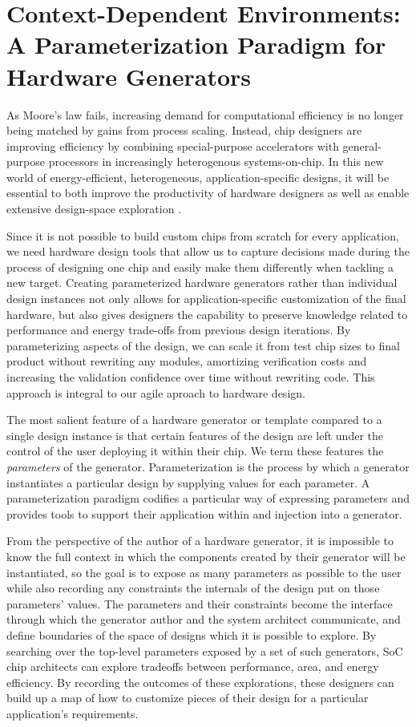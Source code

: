 \chapter{Context-Dependent Environments: \\ A Parameterization Paradigm for Hardware Generators}
\label{c.parameters}

As Moore's law fails, increasing demand for computational efficiency is no longer being matched by gains from process scaling. 
Instead, chip designers are improving efficiency by combining special-purpose accelerators with general-purpose processors in increasingly heterogenous systems-on-chip.
In this new world of energy-efficient, heterogeneous, application-specific designs, it will be essential to both improve the productivity of hardware designers as well as enable extensive design-space exploration \cite{shacham-micro10}.

Since it is not possible to build custom chips from scratch for every application,
we need hardware design tools that allow us to capture decisions made
during the process of designing one chip and easily make them differently when tackling a new target.
Creating parameterized hardware generators rather than individual design instances not only allows for application-specific customization of the final hardware,
but also gives designers the capability to preserve
knowledge related to performance and energy trade-offs from previous design iterations.
By parameterizing aspects of the design, we can scale it from test chip sizes to final product without rewriting any modules, amortizing verification costs and increasing the validation confidence over time without rewriting code.
This approach is integral to our agile aproach to hardware design.

The most salient feature of a hardware generator or template compared to a single design instance is that certain features of the design are left under the control of the user deploying it within their chip.
We term these features the {\em parameters} of the generator.
Parameterization is the process by which a generator instantiates a particular design by supplying values for each parameter.
A parameterization paradigm codifies a particular way of expressing parameters and provides tools to support their application within and injection into a generator.

From the perspective of the author of a hardware generator, it is impossible to know the full context in which the components created by their generator will be instantiated,
so the goal is to expose as many parameters as possible to the user while also recording any constraints the internals of the design put on those parameters' values.
The parameters and their constraints become the interface through which the generator author and the system architect communicate, and define boundaries of the space of designs which it is possible to explore.
By searching over the top-level parameters exposed by a set of such generators, SoC chip architects can explore tradeoffs between performance, area, and energy efficiency.
By recording the outcomes of these explorations, these designers can build up a map of how to customize pieces of their design for a particular application's requirements.

